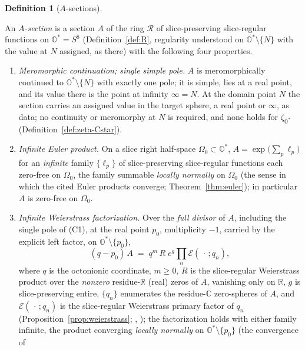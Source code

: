 \documentclass[11pt]{article}
\newcommand{\OO}{\mathbb{O}}
\newcommand{\CC}{\mathbb{C}}
\newcommand{\RR}{\mathbb{R}}
\newcommand{\Ostar}{\OO^{*}}
\newcommand{\zetaO}{\zeta_{\Ostar}}
\providecommand{\lean}[1]{}
\providecommand{\uses}[1]{}
\theoremstyle{plain}
\theoremstyle{definition}
\newtheorem{definition}[theorem]{Definition}
\theoremstyle{remark}
\begin{document}
\begin{definition}[$A$-sections]\label{def:A-section}
\lean{ASection, weierstrassE, spherePrimary}
\uses{def:R, prop:weierstrass, lem:residue-spheres}
An \emph{$A$-section} is a section $A$ of the ring $\mathcal R$ of slice-preserving
slice-regular functions on $\OO^{*}=S^8$ \textup{(Definition~\ref{def:R}, regularity understood
on $\OO^{*}\setminus\{N\}$ with the value at $N$ assigned, as there)} with the following
four properties.
\begin{enumerate}[label=\textup{(C\arabic*)},leftmargin=3.2em]
\item \emph{Meromorphic continuation; single simple pole.} $A$ is meromorphically continued to
  $\OO^{*}\setminus\{N\}$ with exactly one pole; it is simple, lies at a real point, and its
  value there is the point at infinity $\infty=N$. At the domain point $N$ the section carries
  an assigned value in the target sphere, a real point or $\infty$, as data; no continuity or
  meromorphy at $N$ is required, and none holds for $\zetaO$
  \textup{(}Definition~\ref{def:zeta-Cstar}\textup{)}.
\item \emph{Infinite Euler product.} On a slice right half-space $\Omega_0\subset\OO^{*}$,
  $A=\exp\!\big(\sum_p\ell_p\big)$ for an \emph{infinite} family $\{\ell_p\}$ of
  slice-preserving slice-regular functions each zero-free on $\Omega_0$, the family summable
  \emph{locally normally} on $\Omega_0$ \textup{(}the sense in which the cited Euler products
  converge; Theorem~\ref{thm:euler}\textup{)}; in particular $A$ is
  zero-free on $\Omega_0$.
\item \emph{Infinite Weierstrass factorization.} Over the \emph{full divisor} of $A$,
  including the single pole of \textup{(C1)}, at the real point $p_0$, multiplicity $-1$,
  carried by the explicit left factor, on $\OO^{*}\setminus\{p_0\}$,
  \[
    (q-p_0)\,A\;=\;q^{m}\,R\;e^{g}\prod_n\mathcal E(\,\cdot\,;q_n),
  \]
  where $q$ is the octonionic coordinate, $m\ge0$, $R$ is the slice-regular Weierstrass product
  over the \emph{nonzero} residue-$\RR$ \textup{(}real\textup{)} zeros of $A$, vanishing only
  on $\RR$, $g$ is slice-preserving entire, $\{q_n\}$ enumerates the residue-$\CC$ zero-spheres
  of $A$, and $\mathcal E(\,\cdot\,;q_n)$ is the slice-regular Weierstrass primary factor of
  $q_n$ \textup{(}Proposition~\ref{prop:weierstrass}; \cite[Prop.~3.1, Thm.~3.2]{AdFslice},
  \cite{GV}\textup{)}; the factorization holds with either family infinite, the product
  converging \emph{locally normally} on $\OO^{*}\setminus\{p_0\}$ \textup{(}the convergence of

\end{enumerate}
\end{definition}
\end{document}
